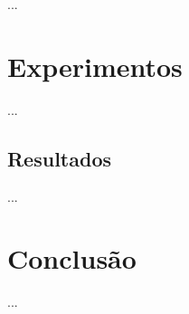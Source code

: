 \documentclass[diss,capa]{texufpel}
\begin{document}
...

\chapter{Experimentos}
\label{chapter::experimentos}

...

\section{Resultados}

...

\chapter{Conclusão}
\label{chapter::Conclusão}

...


 




\end{document}
